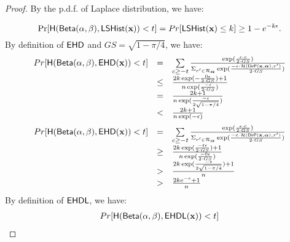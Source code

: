 \documentclass{article}
\begin{document}
\begin{proof}
By the p.d.f. of Laplace distribution, we have:

\[
	\Pr[\mathsf{H}(\mathsf{Beta}(\alpha, \beta), \mathsf{LSHist}(\textbf{x}))< t]
	= Pr[\mathsf{LSHist}(\textbf{x}) \leq k] 
	\geq 1 - e^{-k\epsilon}.
\]
%
%
By definition of $\mathsf{EHD}$ and $GS = \sqrt{1 - \pi/4}$, we have:
%
%
\[
	\begin{array}{lcl}
	Pr[\mathsf{H}(\mathsf{Beta}(\alpha, \beta), \mathsf{EHD}(\textbf{x})) < t] 
	& =  & \sum\limits_{c \geq - t}
	\frac
  {\exp(\frac{\epsilon\cdot c}{2\cdot GS})}
{\Sigma_{r' \in \mathcal{R}_{\boldsymbol{\alpha}}}\exp(\frac{-\epsilon\cdot \mathcal{H}(\mathsf{DirP}(\textbf{x},\boldsymbol{\alpha}), r')}{2\cdot GS})}\\
 	& \leq &
 	\frac
  	{2k\exp(-\frac{0\epsilon }{2\cdot GS}) + 1}
	{n\exp(\frac{-\epsilon }{2\cdot GS})}\\
 	& = &
 	\frac
  	{2k + 1}
	{n\exp(\frac{-\epsilon }{2\sqrt{1 - \pi/4}})}\\
	& < & 
 	\frac
  	{2k + 1}
	{n\exp(-\epsilon)}
\end{array}
\]
\[
	\begin{array}{lcl}
	Pr[\mathsf{H}(\mathsf{Beta}(\alpha, \beta), \mathsf{EHD}(\textbf{x})) < t] 
	& =  & \sum\limits_{c \geq - t}
	\frac
  	{\exp(\frac{\epsilon\cdot c}{2\cdot GS})}
	{\Sigma_{r' \in \mathcal{R}_{\boldsymbol{\alpha}}}\exp(\frac{-\epsilon\cdot \mathcal{H}(\mathsf{DirP}(\textbf{x},\boldsymbol{\alpha}), r')}{2\cdot GS})}\\
 	& \geq &
 	\frac
  	{2k\exp(\frac{-t\epsilon }{2\cdot GS}) + 1}
	{n\exp(\frac{-0\epsilon }{2\cdot GS})}\\
 	& > &
 	\frac
  	{2k\exp(\frac{-\epsilon }{2\sqrt{1 - \pi/4}}) + 1}
	{n}\\
	& > & 
 	\frac
  	{2ke^{-\epsilon} + 1}{n}
\end{array}
\]
%
%
By definition of $\mathsf{EHDL}$, we have:
%
%
\[
	\begin{array}{lcl}
	Pr[\mathsf{H}(\mathsf{Beta}(\alpha, \beta), \mathsf{EHDL}(\textbf{x})) < t] 

\end{array}\]
\end{proof}
\end{document}

